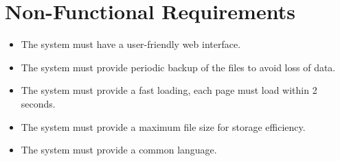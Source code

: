 \color{red}
\section*{Non-Functional Requirements}
\color{black}

\begin{itemize}
\item The system must have a user-friendly web interface.
\item The system must provide periodic backup of the files to avoid loss of data.
\item The system must provide a fast loading, each page must load within 2 seconds.
\item The system must provide a maximum file size for storage efficiency.
\item The system must provide a common language.
\end{itemize}


